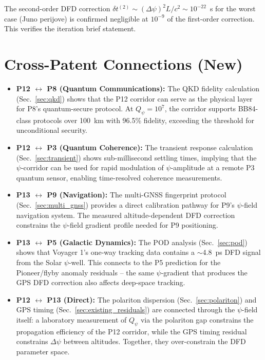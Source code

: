\documentclass[aps,prd,twocolumn,superscriptaddress,nofootinbib]{revtex4-2}
\newcommand{\Qpsi}{Q_\psi}
\begin{document}
The second-order DFD correction $\delta t^{(2)} \sim (\Delta\psi)^2 L/c^2
\sim 10^{-22}$~s for the worst case (Juno perijove) is confirmed
negligible at $10^{-9}$ of the first-order correction. This
verifies the iteration brief statement.

\section{Cross-Patent Connections (New)}
\label{sec:cross}

\begin{itemize}
\item \textbf{P12 $\leftrightarrow$ P8 (Quantum Communications):}
The QKD fidelity calculation (Sec.~\ref{sec:qkd}) shows that the
P12 corridor can serve as the physical layer for P8's quantum-secure
protocol. At $\Qpsi = 10^7$, the corridor supports BB84-class
protocols over 100~km with 96.5\% fidelity, exceeding the threshold
for unconditional security.

\item \textbf{P12 $\leftrightarrow$ P3 (Quantum Coherence):}
The transient response calculation (Sec.~\ref{sec:transient}) shows
sub-millisecond settling times, implying that the $\psi$-corridor can
be used for rapid modulation of $\psi$-amplitude at a remote P3
quantum sensor, enabling time-resolved coherence measurements.

\item \textbf{P13 $\leftrightarrow$ P9 (Navigation):}
The multi-GNSS fingerprint protocol (Sec.~\ref{sec:multi_gnss})
provides a direct calibration pathway for P9's $\psi$-field
navigation system. The measured altitude-dependent DFD correction
constrains the $\psi$-field gradient profile needed for P9 positioning.

\item \textbf{P13 $\leftrightarrow$ P5 (Galactic Dynamics):}
The POD analysis (Sec.~\ref{sec:pod}) shows that Voyager 1's one-way
tracking data contains a $\sim$4.8~ps DFD signal from the Solar
$\psi$-well. This connects to the P5 prediction for the Pioneer/flyby
anomaly residuals -- the same $\psi$-gradient that produces the
GPS DFD correction also affects deep-space tracking.

\item \textbf{P12 $\leftrightarrow$ P13 (Direct):}
The polariton dispersion (Sec.~\ref{sec:polariton}) and GPS timing
(Sec.~\ref{sec:existing_residuals}) are connected through the
$\psi$-field itself: a laboratory measurement of $\Qpsi$ via the
polariton gap constrains the propagation efficiency of the P12
corridor, while the GPS timing residual constrains $\Delta\psi$
between altitudes. Together, they over-constrain the DFD parameter
space.
\end{itemize}
\end{document}
